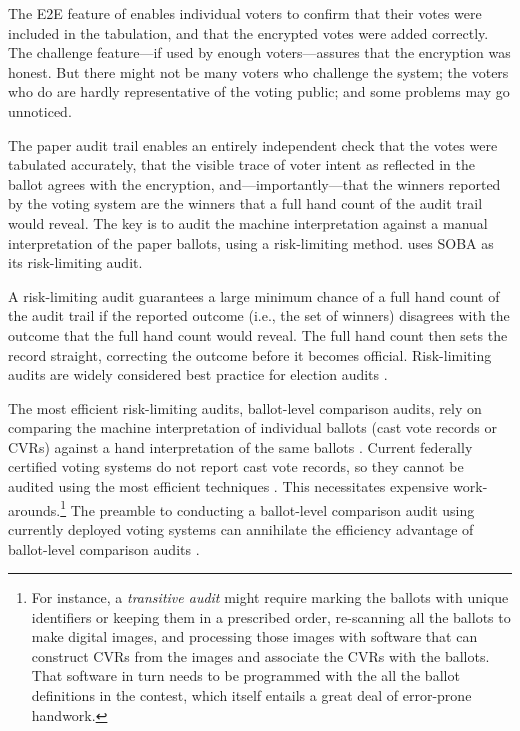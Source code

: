 \label{sec:audit}

The E2E feature of \projname enables individual voters to confirm that their votes were included in the
tabulation, and that the encrypted votes were added correctly.
The challenge feature---if used by enough voters---assures that the encryption was honest.
But there might not be many voters who challenge the system; the voters who do are hardly
representative of the voting public; and some problems may go unnoticed.

The paper audit trail enables an entirely independent check that the votes were tabulated accurately, that
the visible trace of voter intent as reflected in the ballot agrees with the encryption, and---importantly---that
the winners reported by the voting system are the winners that a full hand count of the audit trail would
reveal.
The key is to audit the machine interpretation against a manual interpretation of the paper ballots,
using a risk-limiting method.
\projname uses SOBA \cite{benalohEtal11} as its risk-limiting audit.

A risk-limiting audit guarantees a large minimum chance of a full hand count of the audit trail if the
reported outcome (i.e., the set of winners) disagrees with the outcome that the full hand count would reveal.
The full hand count then sets the record straight, correcting the outcome before it becomes official.
Risk-limiting audits are widely considered best practice for election audits \citep{bestPractices08}.

The most efficient risk-limiting audits, ballot-level comparison audits, rely on comparing 
the machine interpretation of individual ballots
(cast vote records or CVRs)
against a hand interpretation of the same ballots \citep{stark10d,benalohEtal11,lindemanStark12}.
Current federally certified voting systems do not report cast vote records, so they cannot
be audited using the most efficient techniques \citep{lindemanStark12,wagnerStark12}.
This necessitates expensive work-arounds.\footnote{%
    For instance, a {\em transitive audit\/} might require marking the ballots with unique identifiers
    or keeping them in a prescribed order, re-scanning all the ballots to make digital images,
    and processing those images with software that can construct CVRs from the images and
   associate the CVRs with the ballots.
   That software in turn needs to be programmed with the all the ballot definitions in the contest,
    which itself entails a great deal of error-prone handwork.
}
The preamble to conducting a ballot-level comparison audit using currently deployed voting systems
can annihilate the efficiency advantage of ballot-level comparison audits \citep{wagnerStark12}.

